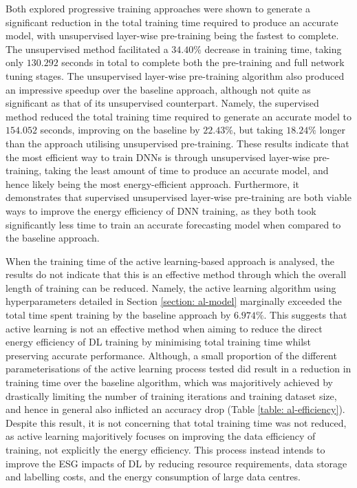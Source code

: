 \documentclass[a4paper, 11pt]{report}
\begin{document}
    Both explored progressive training approaches were shown to generate a significant reduction in the total training time required to produce an accurate model, with unsupervised layer-wise pre-training being the fastest to complete. The unsupervised method facilitated a $34.40\%$ decrease in training time, taking only $130.292$ seconds in total to complete both the pre-training and full network tuning stages. The unsupervised layer-wise pre-training algorithm also produced an impressive speedup over the baseline approach, although not quite as significant as that of its unsupervised counterpart. Namely, the supervised method reduced the total training time required to generate an accurate model to $154.052$ seconds, improving on the baseline by $22.43\%$, but taking $18.24\%$ longer than the approach utilising unsupervised pre-training. These results indicate that the most efficient way to train DNNs is through unsupervised layer-wise pre-training, taking the least amount of time to produce an accurate model, and hence likely being the most energy-efficient approach. Furthermore, it demonstrates that supervised unsupervised layer-wise pre-training are both viable ways to improve the energy efficiency of DNN training, as they both took significantly less time to train an accurate forecasting model when compared to the baseline approach.

    When the training time of the active learning-based approach is analysed, the results do not indicate that this is an effective method through which the overall length of training can be reduced. Namely, the active learning algorithm using hyperparameters detailed in Section \ref{section: al-model} marginally exceeded the total time spent training by the baseline approach by $6.974\%$. This suggests that active learning is not an effective method when aiming to reduce the direct energy efficiency of DL training by minimising total training time whilst preserving accurate performance. Although, a small proportion of the different parameterisations of the active learning process tested did result in a reduction in training time over the baseline algorithm, which was majoritively achieved by drastically limiting the number of training iterations and training dataset size, and hence in general also inflicted an accuracy drop (Table \ref{table: al-efficiency}). Despite this result, it is not concerning that total training time was not reduced, as active learning majoritively focuses on improving the data efficiency of training, not explicitly the energy efficiency. This process instead intends to improve the ESG impacts of DL by reducing resource requirements, data storage and labelling costs, and the energy consumption of large data centres.
\end{document}

